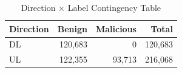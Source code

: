 \begin{table}[htbp]
\centering
\caption{Direction $\times$ Label Contingency Table}\label{tab:dir_label}
\begin{tabular}{lrrr}
\toprule
\textbf{Direction} & \textbf{Benign} & \textbf{Malicious} & \textbf{Total} \\
\midrule
DL & 120,683 & 0 & 120,683 \\
UL & 122,355 & 93,713 & 216,068 \\
\bottomrule
\end{tabular}
\end{table}
